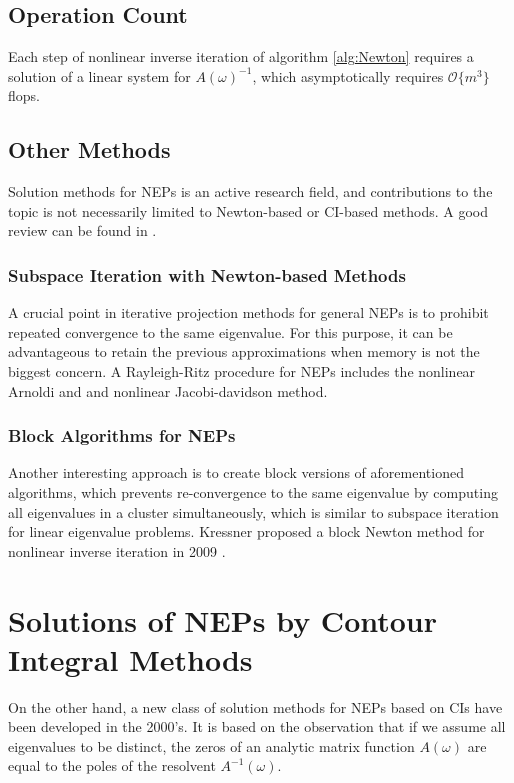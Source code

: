 \documentclass[final,leqno,onefignum,onetabnum]{siamltex1213}
\begin{document}
\subsection{Operation Count}
Each step of nonlinear inverse iteration of algorithm \ref{alg:Newton} requires a solution of a linear system for $A(\omega)^{-1}$, which asymptotically requires $\mathcal{O}\{m^3\}$ flops. 

\subsection{Other Methods}
Solution methods for NEPs is an active research field, and contributions to the topic is not necessarily limited to Newton-based or CI-based methods. A good review can be found in \citep{effenberger_robust_2013}. 
\subsubsection{Subspace Iteration with Newton-based Methods}
A crucial point in iterative projection methods for general NEPs is to  prohibit repeated convergence to  the same eigenvalue. For this purpose, it can be advantageous to retain the previous approximations when memory is not the biggest concern. A Rayleigh-Ritz procedure for NEPs includes the nonlinear Arnoldi and \citep{voss2004arnoldi} and nonlinear Jacobi-davidson \citep{mehrmann2004nonlinear, voss2007jacobi} method. 
\subsubsection{Block Algorithms for NEPs}
Another interesting approach is to create block versions of aforementioned algorithms, which prevents re-convergence to the same eigenvalue by computing all eigenvalues in a cluster simultaneously, which is similar to subspace iteration for linear eigenvalue problems. Kressner proposed a block Newton method for nonlinear inverse iteration in 2009 \citep{kressner2009block}. 
\section{Solutions of NEPs by Contour Integral Methods}
On the other hand, a new class of solution methods for NEPs based on CIs have been developed in the 2000's. It is based on the observation that if we assume all eigenvalues to be distinct, the zeros of an analytic matrix function $A(\omega)$ are equal to the poles of the resolvent $A^{-1}(\omega)$. 
\end{document}
